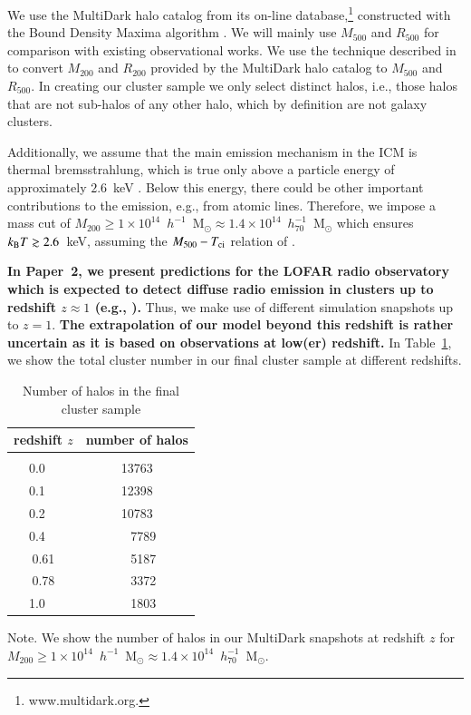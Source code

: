 \documentclass[useAMS,usenatbib]{mn2e}
\begin{document}
We use the MultiDark halo catalog from its on-line database,\footnote{www.multidark.org.} 
constructed with the Bound Density Maxima algorithm \citep{1997astro.ph.12217K}.  
We will mainly use $M_{500}$ and $R_{500}$ for comparison with existing observational works.  
We use the technique described in \cite{2003ApJ...584..702H} to convert $M_{200}$ and
$R_{200}$ provided by the MultiDark halo catalog to $M_{500}$ and $R_{500}$.  In
creating our cluster sample we only select distinct halos, i.e., those halos that
are not sub-halos of any other halo, which by definition are not galaxy clusters.

Additionally, we assume that the main emission mechanism in the ICM is thermal
bremsstrahlung, which is true only above a particle energy of approximately
$2.6$~keV \citep{1988xrec.book.....S}. Below this
energy, there could be other important contributions to the emission,
e.g., from atomic lines. Therefore, we impose a mass cut of
$M_{200}\geq1\times10^{14}$~$h^{-1}$~M$_{\odot}\approx1.4\times10^{14}$~$h_{70}^{-1}$~M$_{\odot}$
which ensures $k_{{\mathrm{B}}}T \gtrsim 2.6$~keV, assuming the $M_{500} - T_{{\mathrm{ci}}}$ relation
of \cite{2010MNRAS.406.1773M}.

{\bf In Paper~2, we present predictions for the LOFAR radio observatory
which is expected to detect diffuse radio emission in clusters up to redshift $z \approx 1$ (e.g.,
\citealp{2012JApA..tmp...34R}).} 
Thus, we make use of different simulation snapshots up to $z=1$. 
{\bf The extrapolation of our model beyond this redshift is rather uncertain as it is based
on observations at low(er) redshift.}
In Table~\ref{tab:z}, we show the total cluster number in our final cluster sample at different redshifts.

\begin{table} 
\begin{center}
\caption{Number of halos in the final cluster sample}
\medskip
\begin{tabular}{cc}
\hline
\phantom{\Big|}
redshift $z$ & number of halos \\
\hline\\[-0.5em]
 0.0~~ &  13763\\
 0.1~~ &  12398\\
 0.2~~ &  10783\\ 
 0.4~~ &   ~~7789\\ 
 0.61  &  ~~5187\\ 
 0.78  &  ~~3372\\ 
 1.0~~ &  ~~1803\\[0.5em]
\hline
\end{tabular}
\label{tab:z}
\end{center}
\footnotesize{Note. We show the number of halos in our MultiDark snapshots at redshift $z$ for $M_{200}\geq1\times10^{14}$~$h^{-1}$~M$_{\odot}\approx1.4\times10^{14}$~$h_{70}^{-1}$~M$_{\odot}$. }
\end{table}
\end{document}
